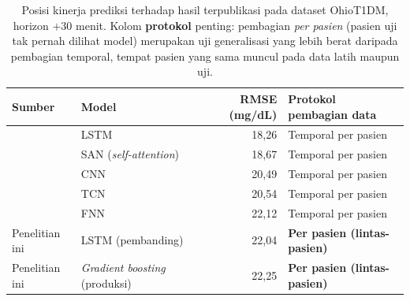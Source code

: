 \begin{table}[htbp]
\centering
\caption{Posisi kinerja prediksi terhadap hasil terpublikasi pada dataset OhioT1DM, horizon $+30$ menit. Kolom \textbf{protokol} penting: pembagian \emph{per pasien} (pasien uji tak pernah dilihat model) merupakan uji generalisasi yang lebih berat daripada pembagian temporal, tempat pasien yang sama muncul pada data latih maupun uji.}
\label{tab:literatur}
\small
\begin{tabular}{@{}llrl@{}}
\toprule
\textbf{Sumber} & \textbf{Model} & \textbf{RMSE (mg/dL)} & \textbf{Protokol pembagian data} \\
\midrule
\textcite{ghimire2024} & LSTM   & 18,26 & Temporal per pasien \\
\textcite{ghimire2024} & SAN (\emph{self-attention}) & 18,67 & Temporal per pasien \\
\textcite{ghimire2024} & CNN    & 20,49 & Temporal per pasien \\
\textcite{ghimire2024} & TCN    & 20,54 & Temporal per pasien \\
\textcite{ghimire2024} & FNN    & 22,12 & Temporal per pasien \\
\midrule
Penelitian ini & LSTM (pembanding) & 22,04 & \textbf{Per pasien (lintas-pasien)} \\
Penelitian ini & \emph{Gradient boosting} (produksi) & 22,25 & \textbf{Per pasien (lintas-pasien)} \\
\bottomrule
\end{tabular}
\end{table}
